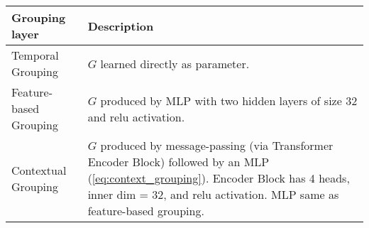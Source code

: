 \begin{tabular}{p{}p{}}
    \toprule
    Grouping layer & Description \\\hline
    Temporal Grouping & $G$ learned directly as parameter.\\\hline
    Feature-based Grouping & $G$ produced by MLP with two hidden layers of size 32 and relu activation. \\\hline
    Contextual Grouping & $G$ produced by message-passing (via Transformer Encoder Block) followed by an MLP (\cref{eq:context_grouping}). Encoder Block has 4 heads, inner dim = 32, and relu activation. MLP same as feature-based grouping.\\
    \bottomrule
\end{tabular}